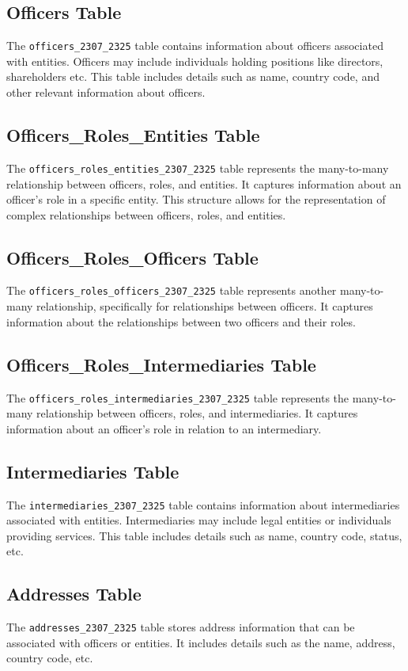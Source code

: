 \documentclass{article}
\begin{document}
\subsection*{Officers Table}
The \texttt{officers\_2307\_2325} table contains information about officers associated with entities. Officers may include individuals holding positions like directors, shareholders etc. This table includes details such as name, country code, and other relevant information about officers.

\subsection*{Officers\_Roles\_Entities Table}
The \texttt{officers\_roles\_entities\_2307\_2325} table represents the many-to-many relationship between officers, roles, and entities. It captures information about an officer's role in a specific entity. This structure allows for the representation of complex relationships between officers, roles, and entities.

\subsection*{Officers\_Roles\_Officers Table}
The \texttt{officers\_roles\_officers\_2307\_2325} table represents another many-to-many relationship, specifically for relationships between officers. It captures information about the relationships between two officers and their roles.

\subsection*{Officers\_Roles\_Intermediaries Table}
The \texttt{officers\_roles\_intermediaries\_2307\_2325} table represents the many-to-many relationship between officers, roles, and intermediaries. It captures information about an officer's role in relation to an intermediary.

\subsection*{Intermediaries Table}
The \texttt{intermediaries\_2307\_2325} table contains information about intermediaries associated with entities. Intermediaries may include legal entities or individuals providing services. This table includes details such as name, country code, status, etc.

\subsection*{Addresses Table}
The \texttt{addresses\_2307\_2325} table stores address information that can be associated with officers or entities. It includes details such as the name, address, country code, etc.
\end{document}
